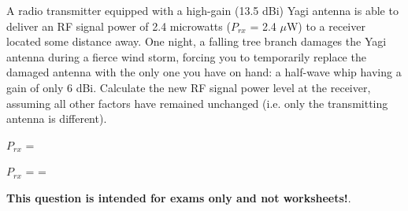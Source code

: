 

A radio transmitter equipped with a high-gain (13.5 dBi) Yagi antenna is able to deliver an RF signal power of 2.4 microwatts ($P_{rx}$ = 2.4 $\mu$W) to a receiver located some distance away.  One night, a falling tree branch damages the Yagi antenna during a fierce wind storm, forcing you to temporarily replace the damaged antenna with the only one you have on hand: a half-wave whip having a gain of only 6 dBi.  Calculate the new RF signal power level at the receiver, assuming all other factors have remained unchanged (i.e. only the transmitting antenna is different).

\vskip 10pt

$P_{rx}$ = \underbar{\hskip 50pt}







$P_{rx}$ =  =  







{\bf This question is intended for exams only and not worksheets!}.



